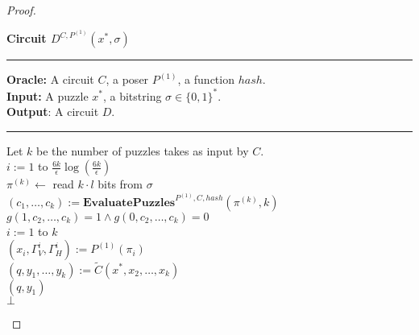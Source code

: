\begin{proof}
\begin{codeblock}
\end{codeblock}
%
\begin{codeblock}
  \textbf{Circuit $D^{C, P^{(1)}}(x^*, \sigma)$}
  \medskip \hrule \medskip
  \textbf{Oracle:} A circuit $C$, a poser $P^{(1)}$, a function $hash$.\\
  \textbf{Input:} A puzzle $x^*$, a bitstring $\sigma \in \{0,1\}^{*}$.\\
  \textbf{Output}: A circuit $D$.
  \medskip\hrule\medskip
  Let $k$ be the number of puzzles takes as input by $C$.\\
  \For $i:=1$ to $\frac{6k}{\epsilon} \log(\frac{6k}{\epsilon})$ \Do \\
  \IndI $\pi^{(k)} \leftarrow$ read $k\cdot l$ bits from $\sigma$ \\
  \IndI $(c_1, \dots, c_{k}) := \textbf{EvaluatePuzzles}^{P^{(1)}, C, hash}(\pi^{(k)}, k)$\\
  \IndI \If $g(1,c_2, \dots, c_k) =1 \land g(0,c_2, \dots, c_k) = 0$ \then \\
  \IndII \For $i:=1$ to $k$ \Do \\
  \IndIII $(x_i, \Gamma_V^{i}, \Gamma_H^{i}) := P^{(1)}(\pi_i)$\\
  \IndII $(q, y_1, \dots, y_{k}) := \widetilde{C}(x^*, x_2, \dots, x_{k})$\\
  \IndII \return $(q, y_1)$\\
  \return $\bot$ \\


\end{codeblock}
\end{proof}
